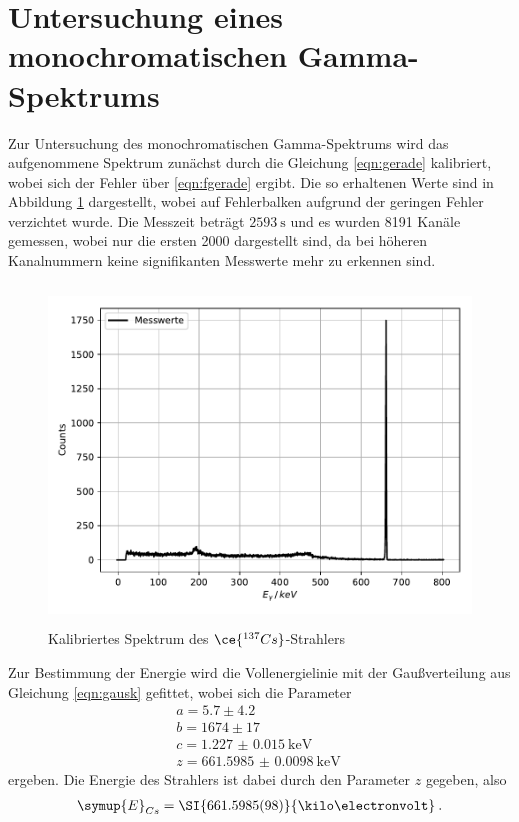 \section{Untersuchung eines monochromatischen Gamma-Spektrums}
Zur Untersuchung des monochromatischen Gamma-Spektrums wird das aufgenommene Spektrum
zunächst durch die Gleichung \ref{eqn:gerade} kalibriert, wobei sich der Fehler über
\ref{eqn:fgerade} ergibt. Die so erhaltenen Werte sind in Abbildung \ref{fig:plot5}
dargestellt, wobei auf Fehlerbalken aufgrund der geringen Fehler verzichtet wurde. Die
Messzeit beträgt $\SI{2593}{\second}$ und es wurden 8191 Kanäle gemessen, wobei nur die
ersten 2000 dargestellt sind, da bei höheren Kanalnummern keine signifikanten Messwerte
mehr zu erkennen sind.
\begin{figure}
  \centering
  \includegraphics[height=9cm]{Cs.pdf}
  \caption{Kalibriertes Spektrum des $\ce{^{137}Cs}$-Strahlers }
  \label{fig:plot5}
\end{figure}
Zur Bestimmung der Energie wird die Vollenergielinie mit der Gaußverteilung aus Gleichung
\ref{eqn:gausk} gefittet, wobei sich die Parameter
\begin{align*}
  a = 5.7 \pm 4.2 \\
  b = 1674 \pm 17 \\
  c = \SI{1.227(15)}{\kilo\electronvolt}\\
  z = \SI{661.5985(98)}{\kilo\electronvolt} \:
\end{align*}
ergeben.
Die Energie des Strahlers ist dabei durch den Parameter $z$ gegeben, also
\begin{align*}
  \symup{E}_{Cs} = \SI{661.5985(98)}{\kilo\electronvolt} \: .
\end{align*}
